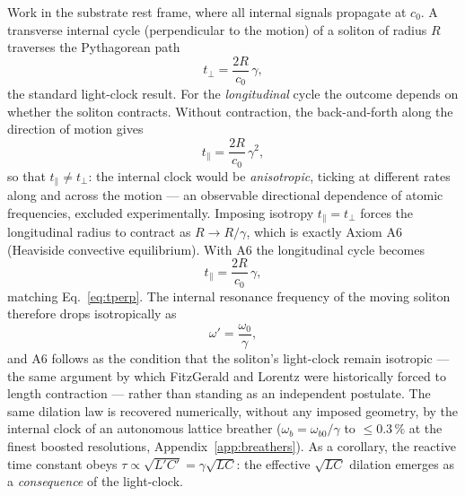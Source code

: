 \documentclass[11pt,a4paper]{article}
\theoremstyle{plain}
\theoremstyle{remark}
\begin{document}
Work in the substrate rest frame, where all internal signals propagate at $c_0$. A transverse internal cycle (perpendicular to the motion) of a soliton of radius $R$ traverses the Pythagorean path
\begin{equation}\label{eq:tperp}
t_\perp = \frac{2R}{c_0}\,\gamma,
\end{equation}
the standard light-clock result. For the \emph{longitudinal} cycle the outcome depends on whether the soliton contracts. Without contraction, the back-and-forth along the direction of motion gives
\begin{equation}\label{eq:tpar_nocontract}
t_\parallel = \frac{2R}{c_0}\,\gamma^2,
\end{equation}
so that $t_\parallel \neq t_\perp$: the internal clock would be \emph{anisotropic}, ticking at different rates along and across the motion --- an observable directional dependence of atomic frequencies, excluded experimentally. Imposing isotropy $t_\parallel = t_\perp$ forces the longitudinal radius to contract as $R \to R/\gamma$, which is exactly Axiom A6 (Heaviside convective equilibrium). With A6 the longitudinal cycle becomes
\begin{equation}\label{eq:tpar_contract}
t_\parallel = \frac{2R}{c_0}\,\gamma,
\end{equation}
matching Eq.~\eqref{eq:tperp}. The internal resonance frequency of the moving soliton therefore drops isotropically as
\begin{equation}
\omega' = \frac{\omega_0}{\gamma},
\end{equation}
and A6 follows as the condition that the soliton's light-clock remain isotropic --- the same argument by which FitzGerald and Lorentz were historically forced to length contraction --- rather than standing as an independent postulate. The same dilation law is recovered numerically, without any imposed geometry, by the internal clock of an autonomous lattice breather ($\omega_b = \omega_{b0}/\gamma$ to $\le 0.3\,\%$ at the finest boosted resolutions, Appendix~\ref{app:breathers}). As a corollary, the reactive time constant obeys $\tau \propto \sqrt{L'C'} = \gamma\sqrt{LC}$: the effective $\sqrt{LC}$ dilation emerges as a \emph{consequence} of the light-clock.
\end{document}
